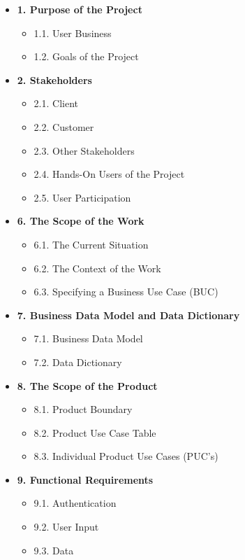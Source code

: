\documentclass[12pt, titlepage]{article}
\begin{document}
\begin{itemize}
    \item \textbf{1. Purpose of the Project}
    \begin{itemize}
        \item 1.1. User Business
        \item 1.2. Goals of the Project
    \end{itemize}
    \item \textbf{2. Stakeholders}
    \begin{itemize}
        \item 2.1. Client
        \item 2.2. Customer
        \item 2.3. Other Stakeholders
        \item 2.4. Hands-On Users of the Project
        \item 2.5. User Participation
    \end{itemize}
    \item \textbf{6. The Scope of the Work}
    \begin{itemize}
        \item 6.1. The Current Situation
        \item 6.2. The Context of the Work
        \item 6.3. Specifying a Business Use Case (BUC)
    \end{itemize}
    \item \textbf{7. Business Data Model and Data Dictionary}
    \begin{itemize}
        \item 7.1. Business Data Model
        \item 7.2. Data Dictionary
    \end{itemize}
    \item \textbf{8. The Scope of the Product}
    \begin{itemize}
        \item 8.1. Product Boundary
        \item 8.2. Product Use Case Table
        \item 8.3. Individual Product Use Cases (PUC's)
    \end{itemize}
    \item \textbf{9. Functional Requirements}
    \begin{itemize}
        \item 9.1. Authentication
        \item 9.2. User Input
        \item 9.3. Data

\end{itemize}
\end{itemize}
\end{document}
